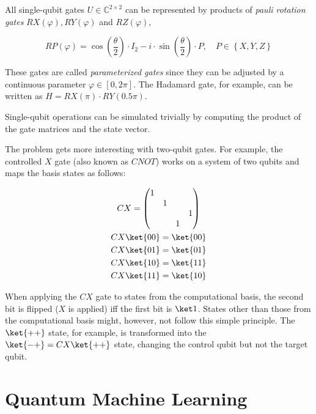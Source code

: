 All single-qubit gates $U \in \mathbb{C}^{2 \times 2}$ can be represented by
products of \emph{pauli rotation gates} $RX(\varphi), RY(\varphi)$ and
$RZ(\varphi)$,

\begin{equation}
    \label{eq:rotational-pauli-gates}
    RP\left(\varphi\right) = \cos\left(\frac\theta2\right) \cdot I_2 - i \cdot \sin\left(\frac\theta2\right) \cdot P,\quad
    P \in \left\{X, Y, Z\right\}
\end{equation}

These gates are called \emph{parameterized gates} since they can be adjusted by a
continuous parameter $\varphi \in \left[0, 2\pi\right]$.
The Hadamard gate, for example, can be written as
$H = RX(\pi) \cdot RY(0.5\pi)$.

Single-qubit operations can be simulated trivially by computing the product of
the gate matrices and the state vector.

The problem gets more interesting with two-qubit gates.
For example, the controlled $X$ gate (also known as $CNOT$) works on a system
of two qubits and maps the basis states as follows:

\begin{gather}
    \label{eq:cx-zbasis}
    CX = \begin{pmatrix}
        1&&&\\
        &1&&\\
        &&&1\\
        &&1&
    \end{pmatrix}\\
    CX \ket{00} = \ket{00}\\
    CX \ket{01} = \ket{01}\\
    CX \ket{10} = \ket{11}\\
    CX \ket{11} = \ket{10}
\end{gather}

When applying the $CX$ gate to states from the computational basis, the second
bit is flipped ($X$ is applied) iff the first bit is $\ket 1$.
States other than those from the computational basis might, however, not follow
this simple principle.
The $\ket{++}$ state, for example, is transformed into the
$\ket{-+} = CX \ket{++}$ state, changing the control qubit but not the target
qubit.

\section{Quantum Machine Learning}

